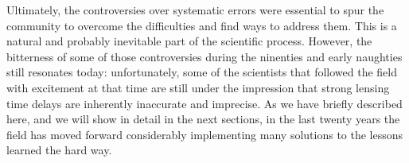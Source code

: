 Ultimately, the controversies over systematic errors were essential to
spur the community to overcome the difficulties and find ways to
address them. This is a natural and probably inevitable part of the
scientific process. However, the bitterness of some of those
controversies during the ninenties and early naughties still resonates
today: unfortunately, some of the scientists that followed the field
with excitement at that time are still under the impression that
strong lensing time delays are inherently inaccurate and imprecise. As
we have briefly described here, and we will show in detail in the
next sections, in the last twenty years the field has moved forward
considerably implementing many solutions to the lessons learned the
hard way.
